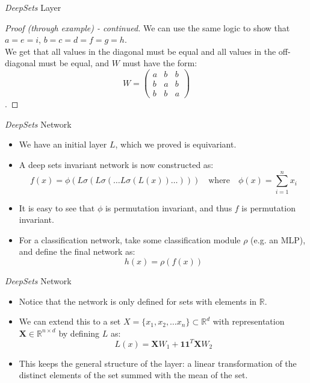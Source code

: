 \documentclass{beamer}
\begin{document}
\begin{frame}{\emph{DeepSets} Layer}
    \begin{proof}[Proof (through example) - continued]
        We can use the same logic to show that $a = e = i$, $b = c = d = f = g = h$.\\
        We get that all values in the diagonal must be equal and all values in the off-diagonal must be equal, and $W$ must have the form:
        \[W = \begin{pmatrix}
            a & b & b\\
            b & a & b\\
            b & b & a
        \end{pmatrix}\].
    \end{proof}
\end{frame}
\begin{frame}{\emph{DeepSets} Network}
    \begin{itemize}
        \setlength{\itemsep}{\fill}
        \item We have an initial layer $L$, which we proved is equivariant.
        \pause
        \item A deep sets invariant network is now constructed as:\\
        \[f(x) = \phi(L\sigma(L\sigma(\ldots L\sigma(L(x)) \ldots))) \quad \text{where} \quad \phi(x) = \sum_{i=1}^{n}x_i \]
        \pause
        \item It is easy to see that $\phi$ is permutation invariant, and thus $f$ is permutation invariant.
        \item For a classification network, take some classification module $\rho$ (e.g. an MLP), and define the final network as:
        \[ h(x) = \rho(f(x)) \]  
    \end{itemize}
\end{frame}
\begin{frame}{\emph{DeepSets} Network}
    \begin{itemize}
        \setlength{\itemsep}{\fill}
        \item Notice that the network is only defined for sets with elements in $\mathbb{R}$.
        \item We can extend this to a set $X = \{x_1, x_2, \dots x_n\} \subset \mathbb{R}^d$ with representation $\textbf{X}\in\mathbb{R}^{n \times d}$ by defining $L$ as:
        \[L(x) = \mathbf{X}W_1 + \mathbf{1}\mathbf{1}^T\mathbf{X}W_2\]
        \item This keeps the general structure of the layer: a linear transformation of the distinct elements of the set summed with the mean of the set.  
    \end{itemize}
\end{frame}
\end{document}
